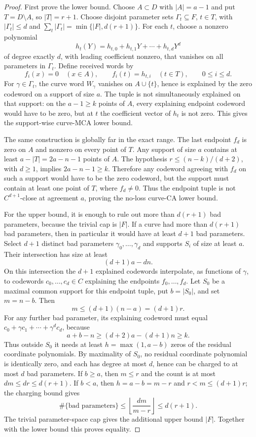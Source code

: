 \begin{proof}
First prove the lower bound.  Choose \(A\subset D\) with \(|A|=a-1\) and put
\(T=D\setminus A\), so \(|T|=r+1\).  Choose disjoint parameter sets
\(\Gamma_t\subseteq F\), \(t\in T\), with \(|\Gamma_t|\le d\) and
\(\sum_t |\Gamma_t|=\min\{|F|,d(r+1)\}\).  For each \(t\), choose a nonzero
polynomial
\[
  h_t(Y)=h_{t,0}+h_{t,1}Y+\cdots+h_{t,d}Y^d
\]
of degree exactly \(d\), with leading coefficient nonzero, that vanishes on all
parameters in \(\Gamma_t\).  Define received words by
\[
  f_i(x)=0\quad(x\in A),
  \qquad
  f_i(t)=h_{t,i}\quad(t\in T),
  \qquad 0\le i\le d .
\]
For \(\gamma\in\Gamma_t\), the curve word \(W_\gamma\) vanishes on
\(A\cup\{t\}\), hence is explained by the zero codeword on a support of size
\(a\).  The tuple is not simultaneously explained on that support: on the
\(a-1\ge k\) points of \(A\), every explaining endpoint codeword would have to be
zero, but at \(t\) the coefficient vector of \(h_t\) is not zero.  This gives the
support-wise curve-MCA lower bound.

The same construction is globally far in the exact range.  The last endpoint
\(f_d\) is zero on \(A\) and nonzero on every point of \(T\).  Any support of
size \(a\) contains at least \(a-|T|=2a-n-1\) points of \(A\).  The hypothesis
\(r\le (n-k)/(d+2)\), with \(d\ge1\), implies \(2a-n-1\ge k\).  Therefore any
codeword agreeing with \(f_d\) on such a support would have to be the zero
codeword, but the support must contain at least one point of \(T\), where
\(f_d\ne0\).  Thus the endpoint tuple is not \(C^{d+1}\)-close at agreement
\(a\), proving the no-loss curve-CA lower bound.

For the upper bound, it is enough to rule out more than \(d(r+1)\) bad
parameters, because the trivial cap is \(|F|\).  If a curve had more than
\(d(r+1)\) bad parameters, then in particular it would have at least \(d+1\)
bad parameters.  Select \(d+1\) distinct bad parameters
\(\gamma_0,\ldots,\gamma_d\) and supports \(S_i\) of size at least \(a\).  Their
intersection has size at least
\[
  (d+1)a-dn .
\]
On this intersection the \(d+1\) explained codewords interpolate, as functions
of \(\gamma\), to codewords \(c_0,\ldots,c_d\in C\) explaining the endpoints
\(f_0,\ldots,f_d\).  Let \(S_0\) be a maximal common support for this endpoint tuple,
put \(b=|S_0|\), and set \(m=n-b\).  Then
\[
  m\le (d+1)(n-a)=(d+1)r .
\]
For any further bad parameter, its explaining codeword must equal
\(c_0+\gamma c_1+\cdots+\gamma^d c_d\), because
\[
  a+b-n\ge (d+2)a-(d+1)n\ge k .
\]
Thus outside \(S_0\) it needs at least \(h=\max(1,a-b)\) zeros of the residual
coordinate polynomials.  By maximality of \(S_0\), no residual coordinate
polynomial is identically zero, and each has degree at most \(d\), hence can be
charged to at most \(d\) bad parameters.  If \(b\ge a\), then \(m\le r\) and the
count is at most \(dm\le dr\le d(r+1)\).  If \(b<a\), then
\(h=a-b=m-r\) and \(r<m\le(d+1)r\); the charging bound gives
\[
  \#\{\text{bad parameters}\}
  \le
  \left\lfloor\frac{dm}{m-r}\right\rfloor
  \le d(r+1).
\]
The trivial parameter-space cap gives the additional upper bound \(|F|\).
Together with the lower bound this proves equality.
\end{proof}

